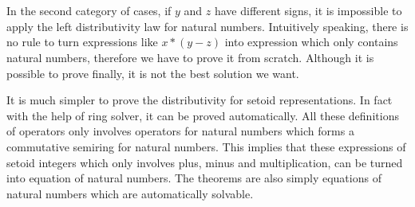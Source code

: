 \begin{code}
\\
\>[4]\<[19]%
\>[19]      \AgdaSymbol{(}  \AgdaSymbol{))} \AgdaSymbol{(} \AgdaSymbol{(}  \AgdaSymbol{)))))}\<%
\\
\>[13]\<[2]%
\>[2]\<%
\\
\>[0]\<[4]%
\>[4] \AgdaSymbol{:}          \AgdaSymbol{(}  \AgdaSymbol{(} \AgdaSymbol{))}  \AgdaSymbol{(}  \AgdaSymbol{)}\<%
\\
\>[0]\<[4]%
\>[4]   \AgdaSymbol{=}  \AgdaSymbol{(} \AgdaSymbol{\_)}\<%
\\
\>[0]\<[4]%
\>[4]  \AgdaSymbol{(} \AgdaSymbol{)} \AgdaSymbol{=} \<%
\\
\>[0]\<[4]%
\>[4]  \AgdaSymbol{(} \AgdaSymbol{)} \AgdaSymbol{=} \<%
\\
\end{code}

In the second category of cases, if $y$ and $z$ have different
signs, it is impossible to apply the left distributivity law for
natural numbers. Intuitively speaking, there is no rule to turn expressions like $x *
(y  - z)$ into expression which only contains natural numbers,
therefore we have to prove it from scratch.
Although it is possible to prove finally, it is not the best solution
we want. 

It is much simpler to prove the distributivity for setoid
representations. In fact with the help of ring solver, it can be
proved automatically.
All these definitions of operators only involves operators for natural
numbers which forms a commutative semiring for natural numbers.
This implies that these expressions of setoid integers which only
involves plus, minus and multiplication, can be turned into equation of natural numbers.
The theorems are also simply equations of natural numbers which are
automatically solvable.


